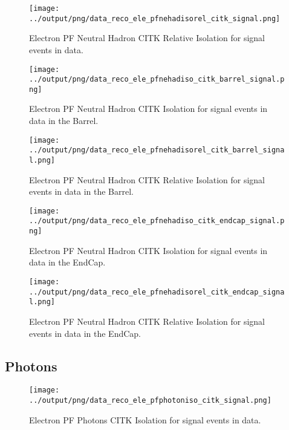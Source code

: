 \documentclass[11pt]{book}
\begin{document}
\begin{figure}[htb]
\centering
\texttt{[image: ../output/png/data\_reco\_ele\_pfnehadisorel\_citk\_signal.png]}
\caption{Electron PF Neutral Hadron CITK Relative Isolation for signal events in data.}
\label{fig:data_ele_pfnehadisorel_citk_signal}
\end{figure}

\begin{figure}[htb]
\centering
\texttt{[image: ../output/png/data\_reco\_ele\_pfnehadiso\_citk\_barrel\_signal.png]}
\caption{Electron PF Neutral Hadron CITK Isolation for signal events in data in the Barrel.}
\label{fig:data_ele_pfnehadiso_citk_barrel_signal}
\end{figure}

\begin{figure}[htb]
\centering
\texttt{[image: ../output/png/data\_reco\_ele\_pfnehadisorel\_citk\_barrel\_signal.png]}
\caption{Electron PF Neutral Hadron CITK Relative Isolation for signal events in data in the Barrel.}
\label{fig:data_ele_pfnehadisorel_citk_barrel_signal}
\end{figure}

\begin{figure}[htb]
\centering
\texttt{[image: ../output/png/data\_reco\_ele\_pfnehadiso\_citk\_endcap\_signal.png]}
\caption{Electron PF Neutral Hadron CITK Isolation for signal events in data in the EndCap.}
\label{fig:data_ele_pfnehadiso_citk_endcap_signal}
\end{figure}

\begin{figure}[htb]
\centering
\texttt{[image: ../output/png/data\_reco\_ele\_pfnehadisorel\_citk\_endcap\_signal.png]}
\caption{Electron PF Neutral Hadron CITK Relative Isolation for signal events in data in the EndCap.}
\label{fig:data_ele_pfnehadisorel_citk_endcap_signal}
\end{figure}
\clearpage

\subsection{Photons}
\begin{figure}[htb]
\centering
\texttt{[image: ../output/png/data\_reco\_ele\_pfphotoniso\_citk\_signal.png]}
\caption{Electron PF Photons CITK Isolation for signal events in data.}
\label{fig:data_ele_pfphotonsiso_citk_signal}
\end{figure}
\end{document}
